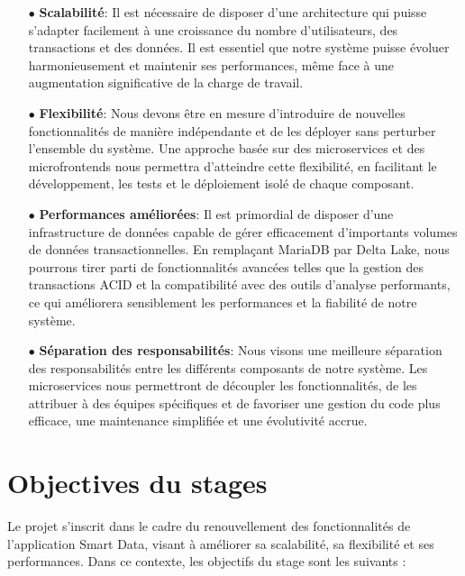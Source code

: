 \begin{enumerate}
    \item[$\bullet$] \textbf{Scalabilité}: Il est nécessaire de disposer d'une architecture qui puisse s'adapter facilement à une croissance du nombre d'utilisateurs, des transactions et des données. Il est essentiel que notre système puisse évoluer harmonieusement et maintenir ses performances, même face à une augmentation significative de la charge de travail.
    \item[$\bullet$] \textbf{Flexibilité}: Nous devons être en mesure d'introduire de nouvelles fonctionnalités de manière indépendante et de les déployer sans perturber l'ensemble du système. Une approche basée sur des microservices et des microfrontends nous permettra d'atteindre cette flexibilité, en facilitant le développement, les tests et le déploiement isolé de chaque composant.
    \item[$\bullet$] \textbf{Performances améliorées}: Il est primordial de disposer d'une infrastructure de données capable de gérer efficacement d'importants volumes de données transactionnelles. En remplaçant MariaDB par Delta Lake, nous pourrons tirer parti de fonctionnalités avancées telles que la gestion des transactions ACID et la compatibilité avec des outils d'analyse performants, ce qui améliorera sensiblement les performances et la fiabilité de notre système.
    \item[$\bullet$] \textbf{Séparation des responsabilités}: Nous visons une meilleure séparation des responsabilités entre les différents composants de notre système. Les microservices nous permettront de découpler les fonctionnalités, de les attribuer à des équipes spécifiques et de favoriser une gestion du code plus efficace, une maintenance simplifiée et une évolutivité accrue.
\end{enumerate}


\section{Objectives du stages}
Le projet s'inscrit dans le cadre du renouvellement des fonctionnalités de l'application Smart Data, visant à améliorer sa scalabilité, sa flexibilité et ses performances. Dans ce contexte, les objectifs du stage sont les suivants :

